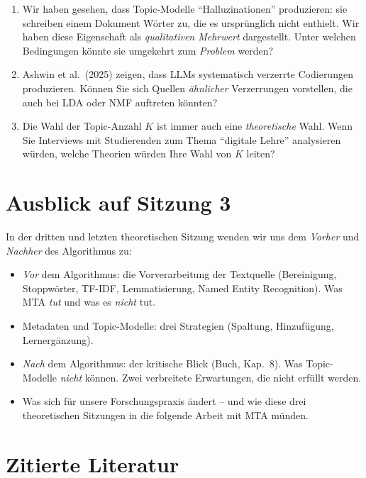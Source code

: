 \documentclass[a4paper,11pt]{article}
\begin{document}
\begin{enumerate}
\item Wir haben gesehen, dass Topic-Modelle \enquote{Halluzinationen}
produzieren: sie schreiben einem Dokument Wörter zu, die es
ursprünglich nicht enthielt. Wir haben diese Eigenschaft als
\emph{qualitativen Mehrwert} dargestellt. Unter welchen Bedingungen
könnte sie umgekehrt zum \emph{Problem} werden?

\item Ashwin et al.\ (2025) zeigen, dass LLMs systematisch verzerrte
Codierungen produzieren. Können Sie sich Quellen \emph{ähnlicher}
Verzerrungen vorstellen, die auch bei LDA oder NMF auftreten könnten?

\item Die Wahl der Topic-Anzahl $K$ ist immer auch eine
\emph{theoretische} Wahl. Wenn Sie Interviews mit Studierenden zum
Thema \enquote{digitale Lehre} analysieren würden, welche Theorien
würden Ihre Wahl von $K$ leiten?
\end{enumerate}

\section{Ausblick auf Sitzung 3}

In der dritten und letzten theoretischen Sitzung wenden wir uns dem
\emph{Vorher} und \emph{Nachher} des Algorithmus zu:

\begin{itemize}
\item \emph{Vor} dem Algorithmus: die Vorverarbeitung der Textquelle
(Bereinigung, Stoppwörter, TF-IDF, Lemmatisierung, Named Entity
Recognition). Was MTA \emph{tut} und was es \emph{nicht} tut.
\item Metadaten und Topic-Modelle: drei Strategien (Spaltung,
Hinzufügung, Lernergänzung).
\item \emph{Nach} dem Algorithmus: der kritische Blick (Buch, Kap.\ 8).
Was Topic-Modelle \emph{nicht} können. Zwei verbreitete
Erwartungen, die nicht erfüllt werden.
\item Was sich für unsere Forschungspraxis ändert -- und wie diese
drei theoretischen Sitzungen in die folgende Arbeit mit MTA münden.
\end{itemize}

\section*{Zitierte Literatur}
\end{document}
